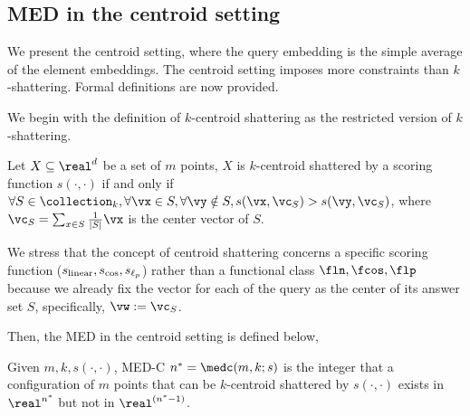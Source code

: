 \subsection{MED in the centroid setting}\label{sec:maed}
We present the centroid setting, where the query embedding is the simple average of the element embeddings. The centroid setting imposes more constraints than $k$-shattering. Formal definitions are now provided.

We begin with the definition of $k$-centroid shattering as the restricted version of $k$-shattering.
\begin{definition}
    Let $X\subseteq \real^d$ be a set of $m$ points, $X$ is $k$-centroid shattered by a scoring function $s(\cdot, \cdot)$ if and only if $\forall S\in \collection_k, \forall \vx\in S, \forall \vy \notin S, s(\vx, \vc_S) > s(\vy, \vc_S)$, where $\vc_S = \sum_{x \in S} \frac{1}{|S|}\vx$ is the center vector of $S$.
\end{definition}
\begin{remark}
    We stress that the concept of centroid shattering concerns a specific scoring function ($s_{\rm linear}, s_{\cos}, s_{\ell_p}$) rather than a functional class $\fln, \fcos, \flp$ because we already fix the vector for each of the query as the center of its answer set $S$, specifically, $\vw:= \vc_S$.
\end{remark}

Then, the MED in the centroid setting is defined below,
\begin{definition}
    Given $m, k, s(\cdot, \cdot)$, MED-C $n^* = \medc(m, k; s)$ is the integer that a configuration of $m$ points that can be $k$-centroid shattered by $s(\cdot, \cdot)$ exists in $\real^{n^*}$ but not in $\real^{(n^*-1)}$.
\end{definition}

